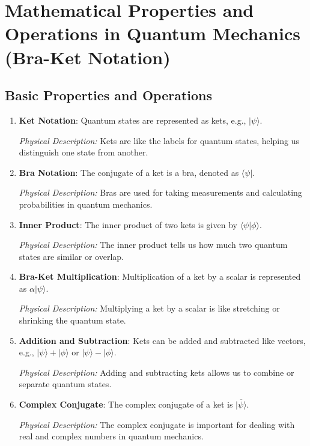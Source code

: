 \documentclass[a4paper]{article}
\begin{document}
\section*{Mathematical Properties and Operations in Quantum Mechanics (Bra-Ket Notation)}

\subsection*{Basic Properties and Operations}

\begin{enumerate}
    \item \textbf{Ket Notation}: Quantum states are represented as kets, e.g., $|\psi\rangle$.
    
    \textit{Physical Description:} Kets are like the labels for quantum states, helping us distinguish one state from another.

    \item \textbf{Bra Notation}: The conjugate of a ket is a bra, denoted as $\langle\psi|$.
    
    \textit{Physical Description:} Bras are used for taking measurements and calculating probabilities in quantum mechanics.

    \item \textbf{Inner Product}: The inner product of two kets is given by $\langle\psi|\phi\rangle$.
    
    \textit{Physical Description:} The inner product tells us how much two quantum states are similar or overlap.

    \item \textbf{Bra-Ket Multiplication}: Multiplication of a ket by a scalar is represented as $\alpha|\psi\rangle$.
    
    \textit{Physical Description:} Multiplying a ket by a scalar is like stretching or shrinking the quantum state.

    \item \textbf{Addition and Subtraction}: Kets can be added and subtracted like vectors, e.g., $|\psi\rangle + |\phi\rangle$ or $|\psi\rangle - |\phi\rangle$.
    
    \textit{Physical Description:} Adding and subtracting kets allows us to combine or separate quantum states.

    \item \textbf{Complex Conjugate}: The complex conjugate of a ket is $\overline{|\psi\rangle}$.
    
    \textit{Physical Description:} The complex conjugate is important for dealing with real and complex numbers in quantum mechanics.


\end{enumerate}
\end{document}
